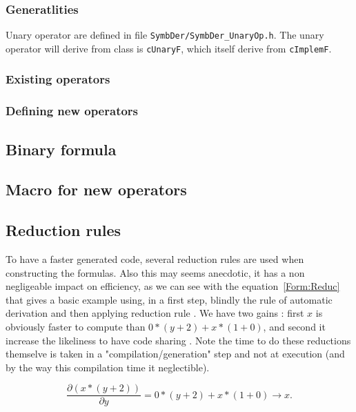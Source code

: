 \subsubsection{Generatlities}

Unary operator are defined in file {\tt SymbDer/SymbDer\_UnaryOp.h}. The unary operator
will derive from class is {\tt cUnaryF}, which itself derive from {\tt cImplemF}.


\subsubsection{Existing operators}

\subsubsection{Defining new operators}

\subsection{Binary formula}


\subsection{Macro for new operators}

\subsection{Reduction rules}

To have a faster generated code, several reduction rules are used when 
constructing the formulas. Also this may seems anecdotic,
it has a non negligeable  impact on efficiency, as we can see with the equation~\ref{Form:Reduc}
that gives a basic example using, in a first step, blindly the 
rule of automatic derivation and then applying reduction rule .
We have two gains : first $x$ is obviously faster to compute than $0 * (y+2) + x * (1 + 0)$,
and second it increase the likeliness to have code sharing . Note the time to do
these reductions themselve is taken in a "compilation/generation" step and not at execution
(and by the way this compilation time it neglectible).

\begin{equation}
	\frac{\partial(x*(y+2))}{\partial y}
	=  0 * (y+2) + x * (1 + 0)
	\rightarrow x
	\label{Form:Reduc}.
\end{equation}

